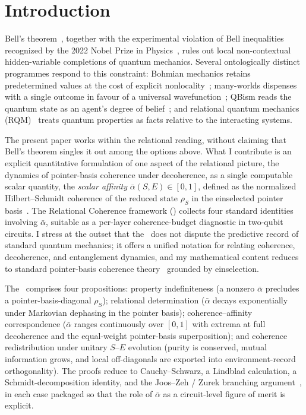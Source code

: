 
\section{Introduction}
\label{sec:intro}

Bell's theorem~\cite{Bell1964,CHSH1969}, together with the experimental
violation of Bell inequalities recognized by the 2022 Nobel Prize in
Physics~\cite{Aspect1982,Zeilinger2022Nobel}, rules out local
non-contextual hidden-variable completions of quantum mechanics.
Several ontologically distinct programmes respond to this constraint:
Bohmian mechanics retains predetermined values at the cost of explicit
nonlocality~\cite{Bohm1980}; many-worlds dispenses with a single outcome
in favour of a universal wavefunction~\cite{Wallace2012}; QBism reads
the quantum state as an agent's degree of belief~\cite{FMS2014}; and
relational quantum mechanics (RQM)~\cite{Rovelli1996,Rovelli2021}
treats quantum properties as facts relative to the interacting systems.

The present paper works within the relational reading, without
claiming that Bell's theorem singles it out among the options above.
What I contribute is an explicit quantitative formulation of one
aspect of the relational picture, the dynamics of pointer-basis coherence under decoherence, as a single computable scalar
quantity, the
\emph{scalar affinity} $\bar\alpha(S,E) \in [0,1]$, defined as the
normalized Hilbert--Schmidt coherence of the reduced state $\rho_S$
in the einselected pointer basis~\cite{Zurek2003,Schlosshauer2005}.
The Relational Coherence framework (\RCF) collects four standard
identities involving $\bar\alpha$, suitable as a per-layer
coherence-budget diagnostic in two-qubit circuits.
I stress at the outset that the \RCF~does not dispute the predictive
record of standard quantum mechanics; it offers a unified notation for
relating coherence, decoherence, and entanglement dynamics, and my
mathematical content reduces to standard pointer-basis coherence
theory~\cite{Baumgratz2014,Streltsov2017Review} grounded by einselection.

The \RCF~comprises four propositions: property indefiniteness (a
nonzero $\bar\alpha$ precludes a pointer-basis-diagonal $\rho_S$);
relational determination ($\bar\alpha$ decays exponentially under
Markovian dephasing in the pointer basis); coherence--affinity
correspondence ($\bar\alpha$ ranges continuously over $[0,1]$ with
extrema at full decoherence and the equal-weight pointer-basis
superposition); and coherence redistribution under unitary $S$--$E$
evolution (purity is conserved, mutual information grows, and local
off-diagonals are exported into environment-record orthogonality).
The proofs reduce to Cauchy--Schwarz, a Lindblad calculation, a
Schmidt-decomposition identity, and the Joos--Zeh / Zurek branching
argument~\cite{JoosZeh1985,Zurek2003}, in each case packaged so that
the role of $\bar\alpha$ as a circuit-level figure of merit is
explicit.

